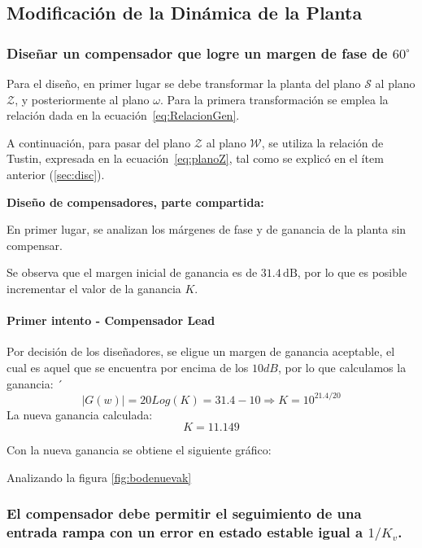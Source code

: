 \subsection{Modificación de la Dinámica de la Planta}
\subsubsection{Diseñar un compensador que logre un margen de fase de $60^\circ$} 

Para el diseño, en primer lugar se debe transformar la planta del plano $\mathcal{S}$ al plano $\mathcal{Z}$, y posteriormente al plano $\mathcal{\omega}$. Para la primera transformación se emplea la relación dada en la ecuación~\ref{eq:RelacionGen}.  

A continuación, para pasar del plano $\mathcal{Z}$ al plano $\mathcal{W}$, se utiliza la relación de Tustin, expresada en la ecuación~\ref{eq:planoZ}, tal como se explicó en el ítem anterior (\ref{sec:disc}).

\textbf{Diseño de compensadores, parte compartida:}

En primer lugar, se analizan los márgenes de fase y de ganancia de la planta sin compensar.


Se observa que el margen inicial de ganancia es de $31.4\,\text{dB}$, por lo que es posible incrementar el valor de la ganancia $K$.

\paragraph{Primer intento - Compensador Lead}
Por decisi\'on de los diseñadores, se eligue un margen de ganancia aceptable, el cual es aquel que se encuentra por encima de los $10dB$, por lo que calculamos la ganancia:
´\[
	|G(w)|=20Log(K) = 31.4-10 \Rightarrow K = 10^{21.4/20}
\]
La nueva ganancia calculada:
\[
	K = 11.149
\]

Con la nueva ganancia se obtiene el siguiente gr\'afico:

Analizando la figura \ref{fig:bodenuevak}
\subsubsection{El compensador debe permitir el seguimiento de una entrada rampa con un error en estado estable igual a $1/K_v$.}
